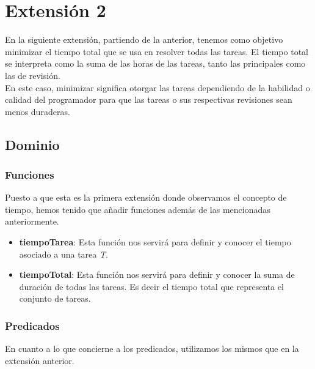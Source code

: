 \documentclass[11pt]{article}
\begin{document}
\section{Extensión 2}
En la siguiente extensión, partiendo de la anterior, tenemos como objetivo minimizar el tiempo total que se usa en resolver todas las tareas. El tiempo total se interpreta como la suma de las horas de las tareas, tanto las principales como las de revisión. 
\\
En este caso, minimizar significa otorgar las tareas dependiendo de la habilidad o calidad del programador para que las tareas o sus respectivas revisiones sean menos duraderas. 
\subsection{Dominio}
\subsubsection{Funciones}

Puesto a que esta es la primera extensión donde observamos el concepto de tiempo, hemos tenido que añadir funciones además de las mencionadas anteriormente. 
\begin{itemize}

\item \textbf{tiempoTarea}: Esta función nos servirá para definir y conocer el tiempo asociado a una tarea \textit{T}.
\item \textbf{tiempoTotal}: Esta función nos servirá para definir y conocer la suma de duración de todas las tareas. Es decir el tiempo total que representa el conjunto de tareas. 

\end{itemize}
\subsubsection{Predicados}
En cuanto a lo que concierne a los predicados, utilizamos los mismos que en la extensión anterior.
\end{document}
